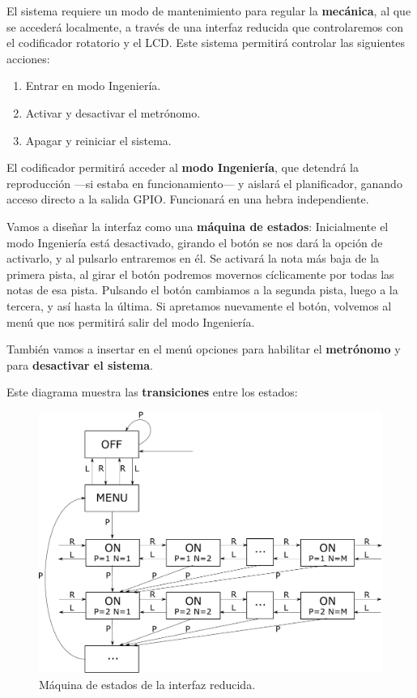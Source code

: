 El sistema requiere un modo de mantenimiento para regular la \textbf{mecánica}, al que se accederá localmente, a través de una interfaz reducida que controlaremos con el codificador rotatorio y el \acrshort{LCD}. Este sistema permitirá controlar las siguientes acciones:

\begin{enumerate}
	\item Entrar en modo Ingeniería.
	\item Activar y desactivar el metrónomo.
	\item Apagar y reiniciar el sistema.
\end{enumerate}

El codificador permitirá acceder al \textbf{modo Ingeniería}, que detendrá la reproducción ---si estaba en funcionamiento--- y  aislará el planificador, ganando acceso directo a la salida \acrshort{GPIO}. Funcionará en una hebra independiente.

Vamos a diseñar la interfaz como una \textbf{máquina de estados}: Inicialmente el modo Ingeniería está desactivado, girando el botón se nos dará la opción de activarlo, y al pulsarlo entraremos en él. Se activará la nota más baja de la primera pista, al girar el botón podremos movernos cíclicamente por todas las notas de esa pista. Pulsando el botón cambiamos a la segunda pista, luego a la tercera, y así hasta la última. Si apretamos nuevamente el botón, volvemos al menú que nos permitirá salir del modo Ingeniería.

También vamos a insertar en el menú opciones para habilitar el \textbf{metrónomo} y para \textbf{desactivar el sistema}.

Este diagrama muestra las \textbf{transiciones} entre los estados:

\smallskip

\begin{figure}[H]
	\noindent \begin{centering}
		\includegraphics[width=\linewidth*3/4]{capitulo4/engineer}
		\par\end{centering}
	\smallskip
	\caption{\label{fig:engineer} Máquina de estados de la interfaz reducida.}
\end{figure} 

